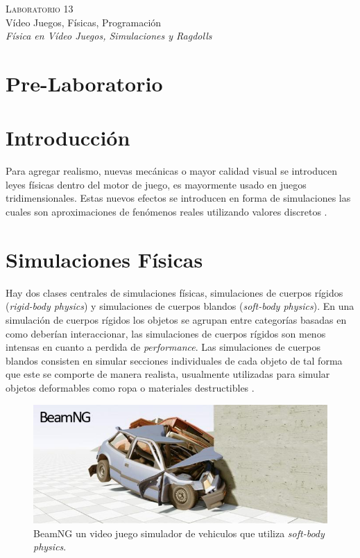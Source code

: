 \begin{center}
\textsc{\Large Laboratorio 13}~\\
{\large Vídeo Juegos, Físicas, Programación}~\\
\emph{Física en Vídeo Juegos, Simulaciones y Ragdolls}
\end{center}

\section{Pre-Laboratorio}

\section{Introducción}
Para agregar realismo, nuevas mecánicas o mayor calidad visual se introducen leyes físicas dentro del motor de juego, es mayormente usado en juegos tridimensionales. Estas nuevos efectos se introducen en forma de simulaciones las cuales son aproximaciones de fenómenos reales utilizando valores discretos \cite{ian_gamephysics}.

\section{Simulaciones Físicas}
Hay dos clases centrales de simulaciones físicas, simulaciones de cuerpos rígidos (\emph{rigid-body physics}) y simulaciones de cuerpos blandos (\emph{soft-body physics}). En una simulación de cuerpos rígidos los objetos se agrupan entre categorías basadas en como deberían interaccionar, las simulaciones de cuerpos rígidos son menos intensas en cuanto a perdida de \emph{performance}. Las simulaciones de cuerpos blandos consisten en simular secciones individuales de cada objeto de tal forma que este se comporte de manera realista, usualmente utilizadas para simular objetos deformables como ropa o materiales destructibles \cite{ian_gamephysics}.
\begin{figure}[H]
\centering
\includegraphics[width=0.9\linewidth]{semana13/beamng_gamephysics.jpg} 
\caption{BeamNG un video juego simulador de vehiculos que utiliza \emph{soft-body physics}.}
\end{figure}

